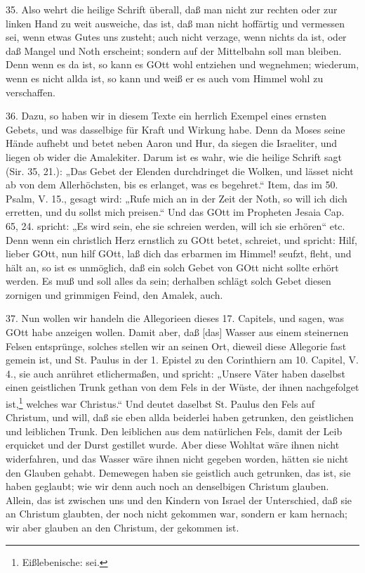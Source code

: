 35. Also wehrt die heilige Schrift überall, daß man nicht zur rechten oder zur linken Hand zu weit ausweiche, das ist, daß man nicht hoffärtig und vermessen sei, wenn etwas Gutes uns zusteht; auch nicht verzage, wenn nichts da ist, oder daß Mangel und Noth erscheint; sondern auf der Mittelbahn soll man bleiben. Denn wenn es da ist, so kann es GOtt wohl entziehen und wegnehmen; wiederum, wenn es nicht allda ist, so kann und weiß er es auch vom Himmel wohl zu verschaffen.

36. Dazu, so haben wir in diesem Texte ein herrlich Exempel eines ernsten Gebets, und was dasselbige für Kraft und Wirkung habe. Denn da Moses seine Hände aufhebt und betet neben Aaron und Hur, da siegen die Israeliter, und liegen ob wider die Amalekiter. Darum ist es wahr, wie die heilige Schrift sagt (Sir. 35, 21.): „Das Gebet der Elenden durchdringet die Wolken, und lässet nicht ab von dem Allerhöchsten, bis es erlanget, was es begehret.“ Item, das im 50. Psalm, V. 15., gesagt wird: „Rufe mich an in der Zeit der Noth, so will ich dich erretten, und du sollst mich preisen.“ Und das GOtt im Propheten Jesaia Cap. 65, 24. spricht: „Es wird sein, ehe sie schreien werden, will ich sie erhören“ etc. Denn wenn ein christlich Herz ernstlich zu GOtt betet, schreiet, und spricht: Hilf, lieber GOtt, nun hilf GOtt, laß dich das erbarmen im Himmel! seufzt, fleht, und hält an, so ist es unmöglich, daß ein solch Gebet von GOtt nicht sollte erhört werden. Es muß und soll alles da sein; derhalben schlägt solch Gebet diesen zornigen und grimmigen Feind, den Amalek, auch.

37. Nun wollen wir handeln die Allegorieen dieses 17. Capitels, und sagen, was GOtt habe anzeigen wollen. Damit aber, daß [das] Wasser aus einem steinernen Felsen entsprünge, solches stellen wir an seinen Ort, dieweil diese Allegorie fast gemein ist, und St. Paulus in der 1. Epistel zu den Corinthiern am 10. Capitel, V. 4., sie auch anrühret etlichermaßen, und spricht: „Unsere Väter haben daselbst einen geistlichen Trunk gethan von dem Fels in der Wüste, der ihnen nachgefolget ist,\footnote{Eißlebenische: sei.} welches war Christus.“ Und deutet daselbst St. Paulus den Fels auf Christum, und will, daß sie eben allda beiderlei haben getrunken, den geistlichen und leiblichen Trunk. Den leiblichen aus dem natürlichen Fels, damit der Leib erquicket und der Durst gestillet wurde. Aber diese Wohltat wäre ihnen nicht widerfahren, und das Wasser wäre ihnen nicht gegeben worden, hätten sie nicht den Glauben gehabt. Demewegen haben sie geistlich auch getrunken, das ist, sie haben geglaubt; wie wir denn auch noch an denselbigen Christum glauben. Allein, das ist zwischen uns und den Kindern von Israel der Unterschied, daß sie an Christum glaubten, der noch nicht gekommen
war, sondern er kam hernach; wir aber glauben an den Christum, der gekommen ist.

